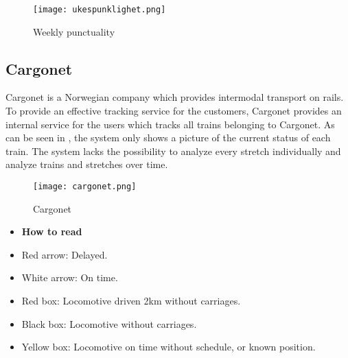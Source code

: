 \begin{figure}[!htbp]
	\texttt{[image: ukespunklighet.png]}
	\caption[Weekly punctuality]{Weekly punctuality\cite{sintefPresis}}
	\label{fig:ukespunklighet}
\end{figure}

\subsection{Cargonet} %
\label{sub:subsection_cargonet}

Cargonet is a Norwegian company which provides intermodal transport on rails. 
To provide an effective tracking service for the customers, Cargonet provides 
an internal service for the users which tracks all trains belonging to Cargonet.
As can be seen in , the system only shows a picture of the 
current status of each train. The system lacks the possibility to analyze 
every stretch individually and analyze trains and stretches over time.

\begin{figure}[!htbp]
	\texttt{[image: cargonet.png]}
	\caption[Cargonet]{Cargonet \cite{cargonet}}
	\label{fig:cargonet}
\end{figure}

\begin{itemize}
	\item [] \textbf{How to read }
	\item Red arrow:\hspace{4ex} Delayed.
	\item White arrow:\hspace{4ex} On time.
	\item Red box:\hspace{4ex} Locomotive driven 2km without carriages.
	\item Black box:\hspace{4ex} Locomotive without carriages.
	\item Yellow box:\hspace{4ex} Locomotive on time without schedule, or known position.
\end{itemize}

